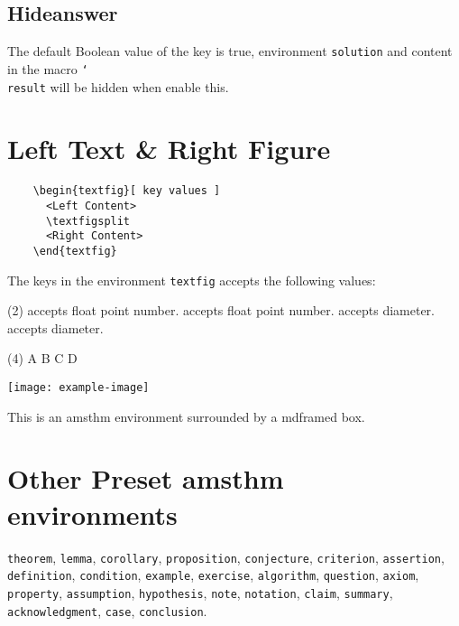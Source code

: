 \documentclass[twoside]{whatsnote}
\providecommand\env{\texttt}
\DeclareRobustCommand\cs[1]{\texttt{\char`\\#1}}
\begin{document}
\subsection{Hideanswer}

The default Boolean value of the key  is true,
environment \env{solution} and content in the macro \cs{result}
will be hidden when enable this.

\section{Left Text \& Right Figure}

\begin{framed}
  \begin{verbatim}
    \begin{textfig}[ key values ]
      <Left Content>
      \textfigsplit
      <Right Content>
    \end{textfig}
  \end{verbatim}
\end{framed}

The keys in the environment \env{textfig} accepts the following values:
\begin{tasks}[ label = \ensuremath\bullet ](2)
  \task {} accepts float point number.
  \task {} accepts float point number.
  \task {} accepts diameter.
  \task {} accepts diameter.
\end{tasks}

\begin{textfig}[ lefthand ratio = .72 ]
  \begin{problem}
    \lipsum [ 1 ]
    \begin{tasks}(4)
      \task A
      \task B
      \task C
      \task D
    \end{tasks}
  \end{problem}
  \textfigsplit
  \centering
  \texttt{[image: example-image]}
\end{textfig}

\begin{remark}
  This is an amsthm environment surrounded by a mdframed box.
  \lipsum [ 2 ]
\end{remark}

\section{Other Preset amsthm environments}

\env{theorem}, \env{lemma}, \env{corollary}, \env{proposition}, 
\env{conjecture}, \env{criterion}, \env{assertion}, \env{definition}, 
\env{condition}, \env{example}, \env{exercise}, \env{algorithm},
\env{question}, \env{axiom}, \env{property}, \env{assumption},
\env{hypothesis}, \env{note}, \env{notation}, \env{claim}, \env{summary}, 
\env{acknowledgment}, \env{case}, \env{conclusion}.
\end{document}
